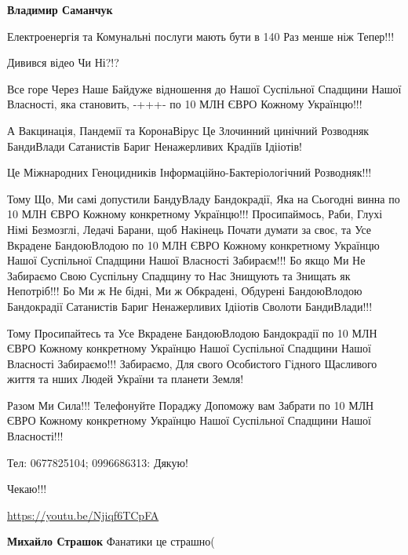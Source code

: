 \begin{itemize}
\begin{itemize}
\textbf{Владимир Саманчук} 

Електроенергія та Комунальні послуги мають бути в 140 Раз менше ніж Тепер!!!

Дивився відео Чи Ні?!?

Все горе Через Наше Байдуже відношення до Нашої Суспільної Спадщини Нашої
Власності, яка становить, -+++- по 10 МЛН ЄВРО Кожному Українцю!!!

А Вакцинація, Пандемії та КоронаВірус Це Злочинний цинічний Розводняк
БандиВлади Сатанистів Бариг Ненажерливих Крадіїв Ідііотів!

Це Міжнародних Геноцидників Інформаційно-Бактеріологічний Розводняк!!!

Тому Що, Ми самі допустили БандуВладу Бандокрадії, Яка на Сьогодні винна по 10
МЛН ЄВРО Кожному конкретному Українцю!!! Просипаймось, Раби, Глухі Німі
Безмозглі, Ледачі Барани, щоб Накінець Почати думати за своє, та Усе Вкрадене
БандоюВлодою по 10 МЛН ЄВРО Кожному конкретному Українцю Нашої Суспільної
Спадщини Нашої Власності Забираєм!!! Бо якщо Ми Не Забираємо Свою Суспільну
Спадщину то Нас Знищують та Знищать як Непотріб!!! Бо Ми ж Не бідні, Ми ж
Обкрадені, Обдурені БандоюВлодою Бандокрадії Сатанистів Бариг Ненажерливих
Ідііотів Сволоти БандиВлади!!!

Тому Просипайтесь та Усе Вкрадене БандоюВлодою Бандокрадії по 10 МЛН ЄВРО
Кожному конкретному Українцю Нашої Суспільної Спадщини Нашої Власності
Забираємо!!! Забираємо, Для свого Особистого Гідного Щасливого життя та нших
Людей України та планети Земля!

Разом Ми Сила!!! Телефонуйте Пораджу Допоможу вам Забрати по 10 МЛН ЄВРО
Кожному конкретному Українцю Нашої Суспільної Спадщини Нашої Власності!!!

Тел: 0677825104; 0996686313: Дякую!

Чекаю!!!

\url{https://youtu.be/Njiqf6TCpFA}

 
\textbf{Михайло Страшок} Фанатики це страшно(

\end{itemize}

 


\end{itemize}
